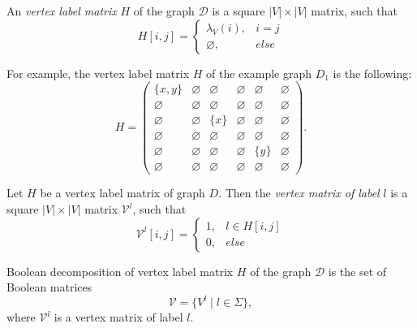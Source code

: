 \begin{definition}

An \emph{vertex label matrix} $H$ of the graph $\mathcal{D}$ is a square $|V|\times|V|$ matrix, such that 
\begin{equation*}
H[i,j] = 
  \begin{cases}
    \lambda_V (i), & i = j \\
    \varnothing,     & else
  \end{cases}
\end{equation*}

For example, the vertex label matrix $H$ of the example graph $D_1$ is the following:
$$
    H =
    \begin{pmatrix}
    \{x, y\}        & \varnothing     &   \varnothing      &   \varnothing   &   \varnothing   &    \varnothing  \\
    \varnothing     &   \varnothing   & \varnothing        &   \varnothing   & \varnothing     & \varnothing     \\
    \varnothing     &   \varnothing   &   \{x\}            &   \varnothing   & \varnothing     &   \varnothing   \\
    \varnothing     &   \varnothing   & \varnothing        &   \varnothing   &   \varnothing   &   \varnothing   \\
    \varnothing     &   \varnothing   &   \varnothing      &    \varnothing  &   \{y\}         & \varnothing     \\
    \varnothing     & \varnothing     &   \varnothing      &   \varnothing   & \varnothing     &   \varnothing
    \end{pmatrix}.
$$
\end{definition}

\begin{definition}
Let $H$ be a vertex label matrix of graph $D$. Then the \emph{vertex matrix of label} $l$ is a square $|V|\times|V|$ matrix $\mathcal{V}^l$, such that
\begin{equation*}
\mathcal{V}^l[i,j] = 
  \begin{cases}
    1,  & l \in H[i, j] \\
    0,  & else
  \end{cases}
\end{equation*}
\end{definition}

\begin{definition}
Boolean decomposition of vertex label matrix $H$ of the graph $\mathcal{D}$ is the set of Boolean matrices
$$\mathcal{V} = \{V^l \mid l \in \Sigma\},$$
where $\mathcal{V}^l$ is a vertex matrix of label $l$.
\end{definition}

